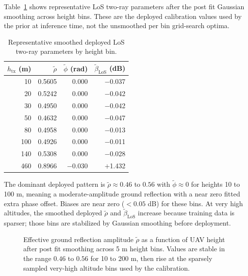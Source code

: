 Table~\ref{tab:los_params} shows representative LoS two-ray parameters after
the post fit Gaussian smoothing across height bins. These are the deployed
calibration values used by the prior at inference time, not the unsmoothed
per bin grid-search optima.

\begin{table}[H]
\centering
\caption{Representative smoothed deployed LoS two-ray parameters by height bin.}
\label{tab:los_params}
\small
\begin{tabular}{rrrr}
\toprule
$h_{\mathrm{tx}}$ (m) & $\tilde{\rho}$ & $\tilde{\phi}$ (rad) & \(\widetilde{\beta}_{\mathrm{LoS}}\) (dB)\\
\midrule
10  & 0.5605 & 0.000 & $-$0.037 \\
20  & 0.5242 & 0.000 & $-$0.042 \\
30  & 0.4950 & 0.000 & $-$0.042 \\
50  & 0.4632 & 0.000 & $-$0.047 \\
80  & 0.4958 & 0.000 & $-$0.013 \\
100 & 0.4926 & 0.000 & $-$0.011 \\
140 & 0.5308 & 0.000 & $-$0.028 \\
460 & 0.8966 & $-$0.030 & $+$1.432 \\
\bottomrule
\end{tabular}
\end{table}

The dominant deployed pattern is $\tilde{\rho} \approx 0.46$ to $0.56$ with
$\tilde{\phi} \approx 0$ for heights 10 to 100 m, meaning a moderate-amplitude
ground reflection with a near zero fitted extra phase offset. Biases are
near zero ($< 0.05$ dB) for these bins. At very high altitudes, the smoothed
deployed $\tilde{\rho}$ and \(\widetilde{\beta}_{\mathrm{LoS}}\) increase because training data is sparser;
those bins are stabilized by Gaussian smoothing before deployment.

\begin{figure}[H]
\centering
{}
\caption[Effective ground reflection amplitude as a function of UAV height.]
{Effective ground reflection amplitude $\tilde{\rho}$ as a function of UAV
height after post fit smoothing across 5 m height bins. Values are stable in
the range $0.46$ to $0.56$ for 10 to 200 m, then rise at the sparsely sampled
very-high altitude bins used by the calibration.}
\label{fig:rho_vs_h}
\end{figure}

